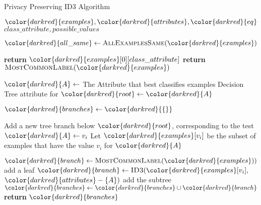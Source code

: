 \begin{algorithm}[H]
\caption{Privacy Preserving ID3 Algorithm }\label{a:id3-pp}
\begin{algorithmic}[1]
\renewcommand{\algorithmicrequire}{\textbf{Private Vars:}}
\Require ${\color{darkred}{examples}}, {\color{darkred}{attributes}}, {\color{darkred}{eq}}$
\renewcommand{\algorithmicrequire}{\textbf{Global Vars:}}
\Require $class\_attribute, possible\_values$

    \State ${\color{darkred}{all\_same}} \gets \textsc{AllExamplesSame}({\color{darkred}{examples}})$
    
        \State \textbf{return} ${\color{darkred}{examples}}[0][class\_attribute]$
        \State \textbf{return} $\textsc{MostCommonLabel}({\color{darkred}{examples}})$
    \EndIf
  
    \State ${\color{darkred}{A}} \gets$ The Attribute that best classifies examples
    \State Decision Tree attribute for ${\color{darkred}{root}} \gets {\color{darkred}{A}}$
    
    \State ${\color{darkred}{branches}} \gets {\color{darkred}{\{\}}}$

        \State Add a new tree branch below ${\color{darkred}{root}}$, corresponding to the test ${\color{darkred}{A}} \gets v_i$
        \State Let ${\color{darkred}{examples}}[v_i]$ be the subset of examples that have the value $v_i$ for ${\color{darkred}{A}}$

            \State ${\color{darkred}{branch}} \gets \textsc{MostCommonLabel}({\color{darkred}{examples}}))$ add a leaf
        \Else
            \State ${\color{darkred}{branch}} \gets \textsc{ID3}({\color{darkred}{examples}}[v_i],$ ${\color{darkred}{attributes}} - \{A\})$ add the subtree
        \EndIf
        \State ${\color{darkred}{branches}} \gets {\color{darkred}{branches}} \cup {\color{darkred}{branch}}$
    \EndFor
    \State \textbf{return} ${\color{darkred}{branches}}$
      
\EndProcedure

\end{algorithmic}
\end{algorithm}

